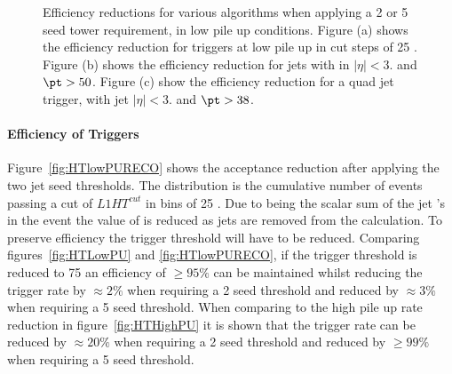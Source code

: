 \begin{figure}[h!]
    \centering
     \newline
    \caption{Efficiency reductions for various \Lone algorithms when applying a 
    2 or 5 \GeV seed tower requirement, in low pile up 
    conditions. Figure (a) shows the efficiency reduction for \HT triggers at 
    low pile up in cut steps of 25 \GeV. Figure (b) 
    shows the efficiency reduction for jets with in $|\eta| <3.$ and $\pt > 
    50$\GeV. Figure (c) show the efficiency reduction for a quad jet trigger, 
    with jet $|\eta| <3.$ and $\pt > 38$\GeV.}
    
    \label{fig:lowpuratereduction}
\end{figure}



\paragraph{Efficiency of \HT Triggers} %
\label{par:Efficneicy of HT triggers}
Figure~\ref{fig:HTlowPURECO} shows the acceptance reduction after applying the 
two jet seed thresholds. The distribution is the cumulative number of events 
passing a cut of $L1 HT^{cut}$ in bins of 25 \GeV. Due to \HT being the scalar 
sum of the jet \PT's in the event the value of \Lone \HT is reduced as jets are 
removed from the calculation. To preserve efficiency the \Lone trigger 
threshold will have to be reduced. Comparing figures~\ref{fig:HTLowPU} and 
\ref{fig:HTlowPURECO}, if the trigger threshold is reduced to 75 \GeV an 
efficiency of $\geq 95\%$ can be maintained whilst reducing the trigger rate by 
$\approx 2\%$ when requiring a 2 \GeV seed threshold and reduced by $\approx 
3\%$ when requiring a 5 \GeV seed threshold. When comparing to the high pile up 
rate reduction in figure~\ref{fig:HTHighPU} it is shown that the trigger rate 
can be reduced by $\approx 20\%$ when requiring a 2 \GeV seed threshold and
reduced by $\geq 99\%$ when requiring a 5 \GeV seed threshold.



